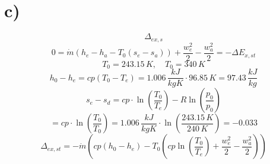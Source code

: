 

\section*{c)}
\[
\Delta_{ex,s}
\]
\[
0 = \dot{m} \left( h_e - h_a - T_0 (s_e - s_a) \right) + \frac{w_e^2}{2} - \frac{w_a^2}{2} = -\Delta E_{x,st}
\]
\[
T_0 = 243.15 \, K, \quad T_0 = 340 \, K
\]
\[
h_0 - h_e = cp \left( T_0 - T_e \right) = 1.006 \, \frac{kJ}{kgK} \cdot 96.85 \, K = 97.43 \, \frac{kJ}{kg}
\]
\[
s_e - s_d = cp \cdot \ln \left( \frac{T_0}{T_e} \right) - R \ln \left( \frac{p_0}{p_0} \right)
\]
\[
= cp \cdot \ln \left( \frac{T_0}{T_0} \right) = 1.006 \, \frac{kJ}{kgK} \cdot \ln \left( \frac{243.15 \, K}{240 \, K} \right) = -0.033
\]
\[
\Delta_{ex,st} = -\dot{m} \left( cp (h_0 - h_e) - T_0 \left( cp \ln \left( \frac{T_0}{T_e} \right) + \frac{w_e^2}{2} - \frac{w_a^2}{2} \right) \right)
\]
